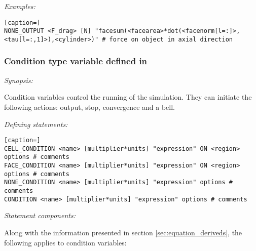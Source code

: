 \emph{Examples:}

\begin{lstlisting}[caption=]
NONE_OUTPUT <F_drag> [N] "facesum(<facearea>*dot(<facenorm[l=:]>,<tau[l=:,1]>),<cylinder>)" # force on object in axial direction
\end{lstlisting}

\subsubsection{Condition type variable defined in }

\emph{Synopsis:}

Condition variables control the running of the simulation.  They can initiate the following actions:  output, stop, convergence and a bell.

\emph{Defining statements:}

\begin{lstlisting}[caption=]
CELL_CONDITION <name> [multiplier*units] "expression" ON <region> options # comments
FACE_CONDITION <name> [multiplier*units] "expression" ON <region> options # comments
NONE_CONDITION <name> [multiplier*units] "expression" options # comments
CONDITION <name> [multiplier*units] "expression" options # comments
\end{lstlisting}

\emph{Statement components:}

Along with the information presented in section \ref{sec:equation_deriveds}, the following applies to condition variables:

